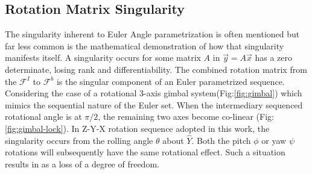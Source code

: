 \subsection{Rotation Matrix Singularity}\label{subsec:dynamics.rigidbody.singularity}
The singularity inherent to Euler Angle parametrization is often mentioned but far less common is the mathematical demonstration of how that singularity manifests itself.  A singularity occurs for some matrix $A$ in $\vec{y}=A\vec{x}$ has a zero determinate, losing rank and differentiability. The combined rotation matrix from the $\mathcal{F}^{I}$ to $\mathcal{F}^{b}$ is the singular component of an Euler parametrized sequence. Considering the case of a rotational 3-axis gimbal system(Fig:\ref{fig:gimbal}) which mimics the sequential nature of the Euler set. When the intermediary sequenced rotational angle is at $\pi/2$, the remaining two axes become co-linear (Fig:\ref{fig:gimbal-lock}). In Z-Y-X rotation sequence adopted in this work, the singularity occurs from the rolling angle $\theta$ about $\hat{Y}$. Both the pitch $\phi$ or yaw $\psi$ rotations will subsequently have the same rotational effect. Such a situation results in as a loss of a degree of freedom.
